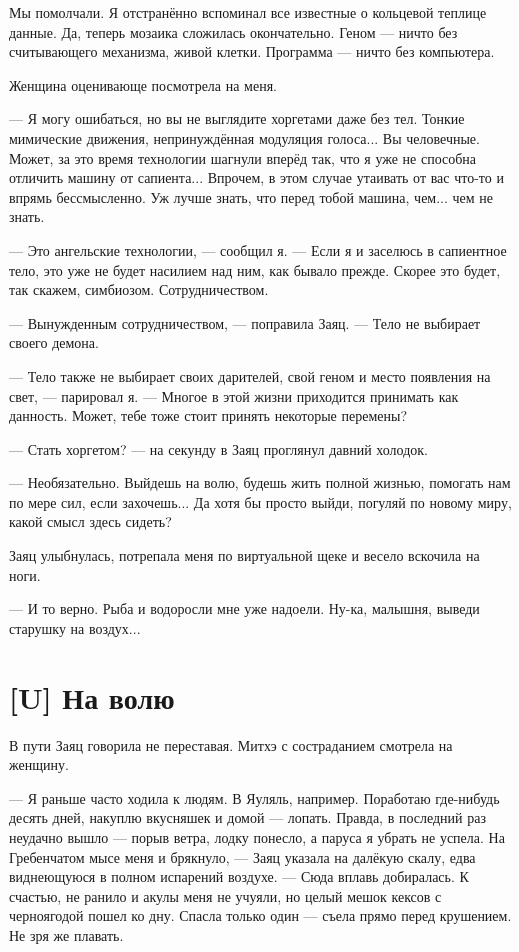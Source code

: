 Мы помолчали.
Я отстранённо вспоминал все известные о кольцевой теплице данные.
Да, теперь мозаика сложилась окончательно.
Геном --- ничто без считывающего механизма, живой клетки.
Программа --- ничто без компьютера.

Женщина оценивающе посмотрела на меня.

--- Я могу ошибаться, но вы не выглядите хоргетами даже без тел.
Тонкие мимические движения, непринуждённая модуляция голоса...
Вы человечные.
Может, за это время технологии шагнули вперёд так, что я уже не способна отличить машину от сапиента...
Впрочем, в этом случае утаивать от вас что-то и впрямь бессмысленно.
Уж лучше знать, что перед тобой машина, чем... чем не знать.

--- Это ангельские технологии, --- сообщил я.
--- Если я и заселюсь в сапиентное тело, это уже не будет насилием над ним, как бывало прежде.
Скорее это будет, так скажем, симбиозом.
Сотрудничеством.

--- Вынужденным сотрудничеством, --- поправила Заяц.
--- Тело не выбирает своего демона.

--- Тело также не выбирает своих дарителей, свой геном и место появления на свет, --- парировал я.
--- Многое в этой жизни приходится принимать как данность.
Может, тебе тоже стоит принять некоторые перемены?

--- Стать хоргетом? --- на секунду в Заяц проглянул давний холодок.

--- Необязательно.
Выйдешь на волю, будешь жить полной жизнью, помогать нам по мере сил, если захочешь...
Да хотя бы просто выйди, погуляй по новому миру, какой смысл здесь сидеть?

Заяц улыбнулась, потрепала меня по виртуальной щеке и весело вскочила на ноги.

--- И то верно.
Рыба и водоросли мне уже надоели.
Ну-ка, малышня, выведи старушку на воздух...

\section{[U] На волю}

В пути Заяц говорила не переставая.
Митхэ с состраданием смотрела на женщину.

--- Я раньше часто ходила к людям.
В Яуляль, например.
Поработаю где-нибудь десять дней, накуплю вкусняшек и домой --- лопать.
Правда, в последний раз неудачно вышло --- порыв ветра, лодку понесло, а паруса я убрать не успела.
На Гребенчатом мысе меня и брякнуло, --- Заяц указала на далёкую скалу, едва виднеющуюся в полном испарений воздухе.
--- Сюда вплавь добиралась.
К счастью, не ранило и акулы меня не учуяли, но целый мешок кексов с черноягодой пошел ко дну.
Спасла только один --- съела прямо перед крушением.
Не зря же плавать.

